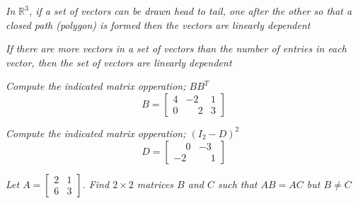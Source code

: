 \documentclass[12pt,letterpaper]{hmcpset}
\begin{document}
\begin{solution}

\end{solution}

\newpage

\begin{problem}[Ch 2.1h]
\textit{In $\mathbb{R}^3$, if a set of vectors can be drawn head to tail, one after the other so that a closed path (polygon) is formed then the vectors are linearly dependent}
\end{problem}

\begin{solution}

\end{solution}

\newpage

\begin{problem}[Ch 2.1j]
\textit{If there are more vectors in a set of vectors than the number of entries in each vector, then the set of vectors are linearly dependent}
\end{problem}

\begin{solution}

\end{solution}

\newpage

\begin{problem}[3.1.8]
\textit{ Compute the indicated matrix opperation; $BB^T$}
$$B=\begin{bmatrix}
4&-2&1\\0&\phantom-2&3
\end{bmatrix}
$$
\end{problem}

\begin{solution}

\end{solution}

\newpage

\begin{problem}[3.1.16]
\textit{ Compute the indicated matrix opperation; $(I_2-D)^2$}
$$D=\begin{bmatrix}
\phantom-0&-3\\-2&\phantom-1
\end{bmatrix}$$
\end{problem}

\begin{solution}

\end{solution}

\newpage

\begin{problem}[3.1.18]
\textit{Let $A=\begin{bmatrix}
2&1\\6&3
\end{bmatrix}$. Find $2\times 2$ matrices $B$ and $C$ such that $AB= AC$ but $B \neq C$}
\end{problem}

\begin{solution}

\end{solution}
\end{document}
